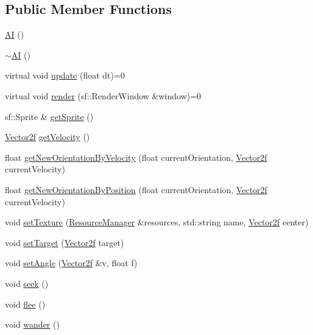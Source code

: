 \subsection*{Public Member Functions}
\begin{DoxyCompactItemize}
\item 
\mbox{\hyperlink{class_a_i_a64ec60281e9eb8496f16525615db54b7}{AI}} ()
\item 
\mbox{\hyperlink{class_a_i_a66a8645f0c27285cd75346f2c2bbfb14}{$\sim$\+AI}} ()
\item 
virtual void \mbox{\hyperlink{class_a_i_a6a845cbba63ca3eaab42771f10175e7f}{update}} (float dt)=0
\item 
virtual void \mbox{\hyperlink{class_a_i_a7d2082a5c1692991512725797346705f}{render}} (sf\+::\+Render\+Window \&window)=0
\item 
sf\+::\+Sprite \& \mbox{\hyperlink{class_a_i_a2d820861174c0e16c7db9b8576cfe7ae}{get\+Sprite}} ()
\item 
\mbox{\hyperlink{class_vector2f}{Vector2f}} \mbox{\hyperlink{class_a_i_a17308d8d0aee28ede770a40407f7f718}{get\+Velocity}} ()
\item 
float \mbox{\hyperlink{class_a_i_af8eeea1934b1e37dff601aedb329004d}{get\+New\+Orientation\+By\+Velocity}} (float current\+Orientation, \mbox{\hyperlink{class_vector2f}{Vector2f}} current\+Velocity)
\item 
float \mbox{\hyperlink{class_a_i_ad61ab7dbffc1376a0d61c4b1ede418a8}{get\+New\+Orientation\+By\+Position}} (float current\+Orientation, \mbox{\hyperlink{class_vector2f}{Vector2f}} current\+Velocity)
\item 
void \mbox{\hyperlink{class_a_i_a747a1974597ef32587e22ed7ff09380c}{set\+Texture}} (\mbox{\hyperlink{class_resource_manager}{Resource\+Manager}} \&resources, std\+::string name, \mbox{\hyperlink{class_vector2f}{Vector2f}} center)
\item 
void \mbox{\hyperlink{class_a_i_af39a721d8336a0c5e03aedbd6c35dc59}{set\+Target}} (\mbox{\hyperlink{class_vector2f}{Vector2f}} target)
\item 
void \mbox{\hyperlink{class_a_i_a79d3e48945e34807fd2e340032cda22d}{set\+Angle}} (\mbox{\hyperlink{class_vector2f}{Vector2f}} \&v, float f)
\item 
void \mbox{\hyperlink{class_a_i_a52f464d4a5079e2e3a11aeb4f18c4fc3}{seek}} ()
\item 
void \mbox{\hyperlink{class_a_i_a89507f04066c22ee528a14cc4d0edc7e}{flee}} ()
\item 
void \mbox{\hyperlink{class_a_i_a3206d8de1de5e5171b81f2eecf5b1449}{wander}} ()
\end{DoxyCompactItemize}
